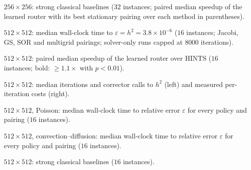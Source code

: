 \begin{table}[H]
\color{red}
\centering
\caption{$256\times256$: strong classical baselines ($32$ instances; paired median speedup of the learned router with its best stationary pairing over each method in parentheses).}
\resizebox{\textwidth}{!}{\cabaselinesB}
\label{tab:ca_baselines_256}
\end{table}

\begin{table}[H]
\color{red}
\centering
\caption{$512\times512$: median wall-clock time to $\varepsilon = h^2 = 3.8\times10^{-6}$ ($16$ instances; Jacobi, GS, SOR and multigrid pairings; solver-only runs capped at $8000$ iterations).}
\resizebox{\textwidth}{!}{\cawcmainC}
\label{tab:ca_main_512}
\end{table}

\begin{table}[H]
\color{red}
\centering
\caption{$512\times512$: paired median speedup of the learned router over HINTS ($16$ instances; bold: $\ge1.1\times$ with $p<0.01$).}
\resizebox{0.95\textwidth}{!}{\cavshintsC}
\label{tab:ca_vshints_512}
\end{table}

\begin{table}[H]
\color{red}
\centering
\caption{$512\times512$: median iterations and corrector calls to $h^2$ (left) and measured per-iteration costs (right).}
\resizebox{0.48\textwidth}{!}{\causageC}\hfill\resizebox{0.48\textwidth}{!}{\cacostsC}
\label{tab:ca_usage_512}
\end{table}

\begin{table}[H]
\color{red}
\centering
\caption{$512\times512$, Poisson: median wall-clock time to relative error $\varepsilon$ for every policy and pairing ($16$ instances).}
\resizebox{\textwidth}{!}{\cawctolpoissonC}
\label{tab:ca_tol_poisson_512}
\end{table}

\begin{table}[H]
\color{red}
\centering
\caption{$512\times512$, convection--diffusion: median wall-clock time to relative error $\varepsilon$ for every policy and pairing ($16$ instances).}
\resizebox{\textwidth}{!}{\cawctolconvC}
\label{tab:ca_tol_convdiff_512}
\end{table}

\begin{table}[H]
\color{red}
\centering
\caption{$512\times512$: strong classical baselines ($16$ instances).}
\resizebox{\textwidth}{!}{\cabaselinesC}
\label{tab:ca_baselines_512}
\end{table}

